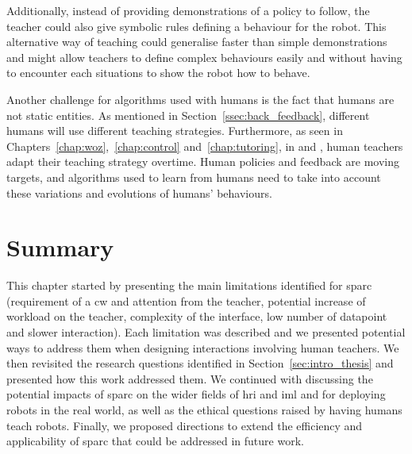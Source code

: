 Additionally, instead of providing demonstrations of a policy to follow, the teacher could also give symbolic rules defining a behaviour for the robot. This alternative way of teaching could generalise faster than simple demonstrations and might allow teachers to define complex behaviours easily and without having to encounter each situations to show the robot how to behave. %

Another challenge for algorithms used with humans is the fact that humans are not static entities. As mentioned in Section~\ref{ssec:back_feedback}, different humans will use different teaching strategies. Furthermore, as seen in Chapters~\ref{chap:woz},~\ref{chap:control} and~\ref{chap:tutoring}, in \cite{thomaz2008teachable} and \cite{macglashan2017interactive}, human teachers adapt their teaching strategy overtime. Human policies and feedback are moving targets, and algorithms used to learn from humans need to take into account these variations and evolutions of humans' behaviours.

\section{Summary} \label{sec:disc_summary}


This chapter started by presenting the main limitations identified for \gls{sparc} (requirement of a \gls{cw} and attention from the teacher, potential increase of workload on the teacher, complexity of the interface, low number of datapoint and slower interaction). Each limitation was described and we presented potential ways to address them when designing interactions involving human teachers. We then revisited the research questions identified in Section~\ref{sec:intro_thesis} and presented how this work addressed them. We continued with discussing the potential impacts of \gls{sparc} on the wider fields of \gls{hri} and \gls{iml} and for deploying robots in the real world, as well as the ethical questions raised by having humans teach robots. Finally, we proposed directions to extend the efficiency and applicability of \gls{sparc} that could be addressed in future work.
